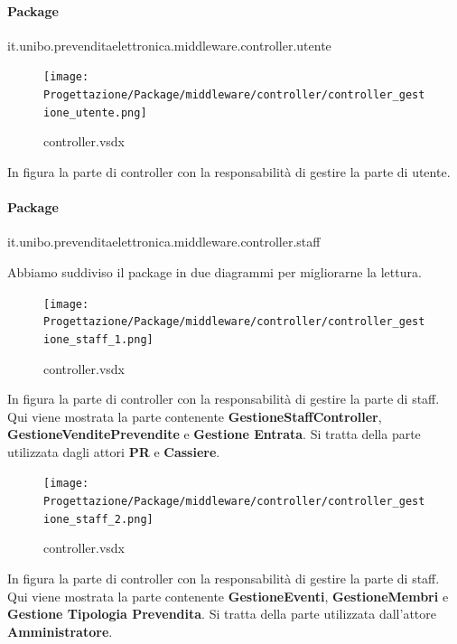 \documentclass[a4paper]{article}
\begin{document}
\newpage

\paragraph{Package} it.unibo.prevenditaelettronica.middleware.controller.utente


\begin{figure}[H]
    \texttt{[image: Progettazione/Package/middleware/controller/controller\_gestione\_utente.png]}
    \centering
    \caption{controller.vsdx}
\end{figure}

In figura la parte di controller con la responsabilità di gestire la parte di utente.

\paragraph{Package} it.unibo.prevenditaelettronica.middleware.controller.staff


Abbiamo suddiviso il package in due diagrammi per migliorarne la lettura.

\begin{figure}[H]
    \texttt{[image: Progettazione/Package/middleware/controller/controller\_gestione\_staff\_1.png]}
    \centering
    \caption{controller.vsdx}
\end{figure}

In figura la parte di controller con la responsabilità di gestire la parte di staff. Qui viene mostrata la parte contenente \textbf{GestioneStaffController}, \textbf{GestioneVenditePrevendite} e \textbf{Gestione Entrata}. Si tratta della parte utilizzata dagli attori \textbf{PR} e \textbf{Cassiere}.\\

\begin{figure}[H]
    \texttt{[image: Progettazione/Package/middleware/controller/controller\_gestione\_staff\_2.png]}
    \centering
    \caption{controller.vsdx}
\end{figure}

In figura la parte di controller con la responsabilità di gestire la parte di staff. Qui viene mostrata la parte contenente \textbf{GestioneEventi}, \textbf{GestioneMembri} e \textbf{Gestione Tipologia Prevendita}. Si tratta della parte utilizzata dall'attore \textbf{Amministratore}.
\end{document}
